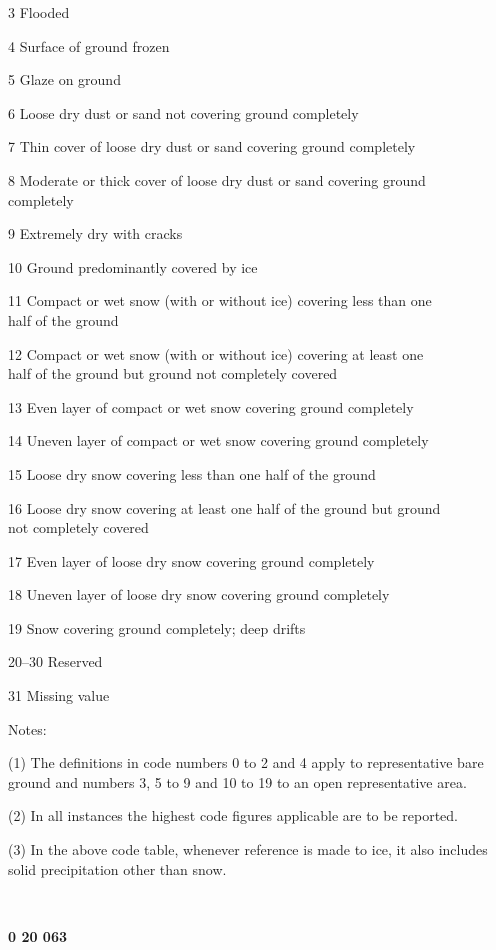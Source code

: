 3 Flooded

4 Surface of ground frozen

5 Glaze on ground

6 Loose dry dust or sand not covering ground completely

7 Thin cover of loose dry dust or sand covering ground completely

8 Moderate or thick cover of loose dry dust or sand covering ground\\
completely

9 Extremely dry with cracks

10 Ground predominantly covered by ice

11 Compact or wet snow (with or without ice) covering less than one\\
half of the ground

12 Compact or wet snow (with or without ice) covering at least one\\
half of the ground but ground not completely covered

13 Even layer of compact or wet snow covering ground completely

14 Uneven layer of compact or wet snow covering ground completely

15 Loose dry snow covering less than one half of the ground

16 Loose dry snow covering at least one half of the ground but ground\\
not completely covered

17 Even layer of loose dry snow covering ground completely

18 Uneven layer of loose dry snow covering ground completely

19 Snow covering ground completely; deep drifts

20--30 Reserved

31 Missing value

Notes:

(1) The definitions in code numbers 0 to 2 and 4 apply to representative bare ground and numbers 3, 5 to 9 and 10 to 19 to an open representative area.

(2) In all instances the highest code figures applicable are to be reported.

(3) In the above code table, whenever reference is made to ice, it also includes solid precipitation other than snow.

\textbf{\\
}

\textbf{0 20 063}

